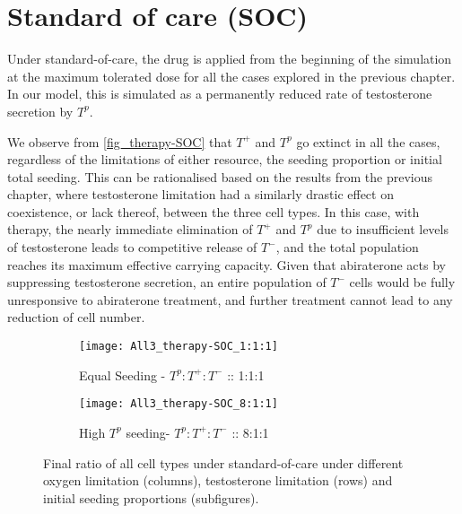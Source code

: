 \section{Standard of care (SOC)}
Under standard-of-care, the drug is applied from the beginning of the simulation at the maximum tolerated dose for all the cases explored in the previous chapter. In our model, this is simulated as a permanently reduced rate of testosterone secretion by $T^p$.

We observe from \autoref{fig_therapy-SOC} that $T^+$ and $T^p$ go extinct in all the cases, regardless of the limitations of either resource, the seeding proportion or initial total seeding. This can be rationalised based on the results from the previous chapter, where testosterone limitation had a similarly drastic effect on coexistence, or lack thereof, between the three cell types. In this case, with therapy, the nearly immediate elimination of $T^+$ and $T^p$ due to insufficient levels of testosterone leads to competitive release of $T^-$, and the total population reaches its maximum effective carrying capacity. Given that abiraterone acts by suppressing testosterone secretion, an entire population of $T^-$ cells would be fully unresponsive to abiraterone treatment, and further treatment cannot lead to any reduction of cell number.

\begin{figure}[h!]
  \centering
  \begin{subfigure}[b]{\textwidth}
    \centering
    \texttt{[image: All3\_therapy-SOC\_1:1:1]}
    \caption{Equal Seeding - $T^p:T^+:T^-$ :: 1:1:1}
    \label{fig_therapy-SOC_1:1:1}
  \end{subfigure}
  \begin{subfigure}[b]{\textwidth}
    \centering
    \texttt{[image: All3\_therapy-SOC\_8:1:1]}
    \caption{High $T^p$ seeding- $T^p:T^+:T^-$ :: 8:1:1}
    \label{fig_therapy-SOC_8:1:1}
  \end{subfigure}
  \caption[Final ratio of all cell types under standard-of-care]{Final ratio of all cell types under standard-of-care under different oxygen limitation (columns), testosterone limitation (rows) and initial seeding proportions (subfigures).}
  \label{fig_therapy-SOC}
\end{figure}

\newpage

